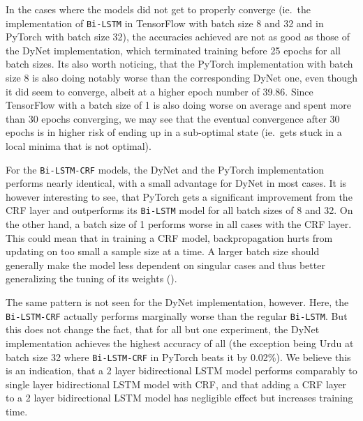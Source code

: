 In the cases where the models did not get to properly converge (ie.\ the
implementation of \texttt{Bi-LSTM} in TensorFlow with batch size 8 and 32 and in
PyTorch with batch size 32), the accuracies achieved are not as good as those of
the DyNet implementation, which terminated training before 25 epochs for
all batch sizes. Its also worth noticing, that the PyTorch implementation with
batch size 8 is also doing notably worse than the corresponding DyNet one, even
though it did seem to converge, albeit at a higher epoch number of 39.86. Since
TensorFlow with a batch size of 1 is also doing worse on average and spent more
than 30 epochs converging, we may see that the eventual convergence after 30
epochs is in higher risk of ending up in a sub-optimal state (ie.\ gets stuck in
a local minima that is not optimal).

For the \texttt{Bi-LSTM-CRF} models, the DyNet and the PyTorch implementation
performs nearly identical, with a small advantage for DyNet in most cases. It is
however interesting to see, that PyTorch gets a significant improvement from the
CRF layer and outperforms its \texttt{Bi-LSTM} model for all batch sizes of 8
and 32. On the other hand, a batch size of 1 performs worse in all cases with
the CRF layer. This could mean that in training a CRF model, backpropagation
hurts from updating on too small a sample size at a time. A larger batch size
should generally make the model less dependent on singular cases and thus better
generalizing the tuning of its weights (\cite{falcon2018lstms}).

The same pattern is not seen for the DyNet implementation, however. Here, the
\texttt{Bi-LSTM-CRF} actually performs marginally worse than the regular
\texttt{Bi-LSTM}. But this does not change the fact, that for all but one
experiment, the DyNet implementation achieves the highest accuracy of all (the
exception being Urdu at batch size 32 where \texttt{Bi-LSTM-CRF} in PyTorch
beats it by 0.02\%). We believe this is an indication, that a 2 layer
bidirectional LSTM model performs comparably to single layer bidirectional LSTM
model with CRF, and that adding a CRF layer to a 2 layer bidirectional LSTM
model has negligible effect but increases training time.

\pagebreak
